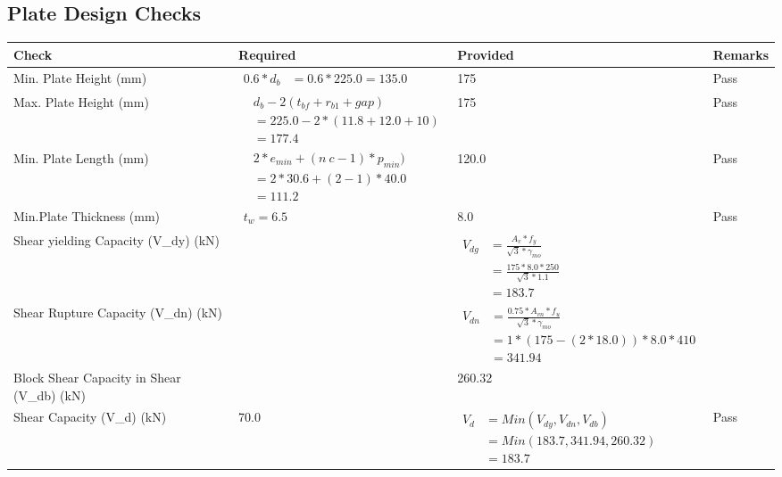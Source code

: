 \documentclass{article}%
\begin{document}
\subsection{Plate Design Checks}%
\label{subsec:PlateDesignChecks}%
\renewcommand{\arraystretch}{1.2}%
\begin{longtable}{|p{4cm}|p{5cm}|p{5.5cm}|p{1.5cm}|}%
\hline%
\rowcolor{OsdagGreen}%
Check&Required&Provided&Remarks\\%
\hline%
\endhead%
\hline%
Min. Plate Height (mm)&$\begin{aligned}0.6 * d_b&= 0.6 * 225.0=135.0\end{aligned}$&175&Pass\\%
\hline%
Max. Plate Height (mm)&$\begin{aligned} &d_b - 2 (t_{bf} + r_{b1} + gap)\\ &=225.0- 2* (11.8+12.0+ 10)\\ &=177.4\end{aligned}$&175&Pass\\%
\hline%
Min. Plate Length (mm)&$\begin{aligned} &2*e_{min} + (n~c-1) * p_{min})\\ &=2*30.6+(2-1) * 40.0\\ &=111.2\end{aligned}$&120.0&Pass\\%
\hline%
Min.Plate Thickness (mm)&$\begin{aligned} t_w=6.5\end{aligned}$&8.0&Pass\\%
\hline%
Shear yielding Capacity (V\_dy) (kN)&&$\begin{aligned} V_{dg} &= \frac{A_v*f_y}{\sqrt{3}*\gamma_{mo}}\\ &=\frac{175*8.0*250}{\sqrt{3}*1.1}\\ &=183.7\end{aligned}$&\\%
\hline%
Shear Rupture Capacity (V\_dn) (kN)&&$\begin{aligned} V_{dn} &= \frac{0.75*A_{vn}*f_u}{\sqrt{3}*\gamma_{mo}}\\ &=1*(175-(2*18.0))*8.0*410\\ &=341.94\end{aligned}$&\\%
\hline%
Block Shear Capacity in Shear (V\_db) (kN)&&260.32&\\%
\hline%
Shear Capacity (V\_d) (kN)&70.0&$\begin{aligned} V_d &= Min(V_{dy},V_{dn},V_{db})\\ &= Min(183.7,341.94,260.32)\\ &=183.7\end{aligned}$&Pass\\%

\end{longtable}
\end{document}
